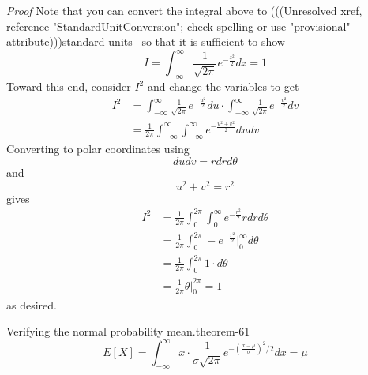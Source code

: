 \documentclass[10pt,]{book}
\makeatletter
\renewcommand*{\proofname}{Proof}
\renewenvironment{proof}[1][\proofname]{\par
  \pushQED{\qed}%
  \normalfont \topsep6\p@\@plus6\p@\relax
  \trivlist
  \item\relax
    {\itshape
    #1\@addpunct{.}}\hspace\labelsep\ignorespaces
}{%
  \popQED\endtrivlist\@endpefalse
}
\numberwithin{equation}{section}
\makeatother
\begin{document}
\begin{proof}\hypertarget{proof-63}{}
\hypertarget{p-1213}{}%
Note that you can convert the integral above to {(((Unresolved xref, reference "StandardUnitConversion"; check spelling or use "provisional" attribute)))}\hyperlink{}{standard units~} so that it is sufficient to show%
\begin{equation*}
I = \int_{-\infty}^{\infty} \frac{1}{\sqrt{2 \pi}} e^{ -\frac{z^2}{2} } dz = 1
\end{equation*}
Toward this end, consider \(I^2\) and change the variables to get%
\begin{align*}
I^2 & = \int_{-\infty}^{\infty} \frac{1}{\sqrt{2 \pi}} e^{ -\frac{u^2}{2} } du \cdot \int_{-\infty}^{\infty} \frac{1}{\sqrt{2 \pi}} e^{ -\frac{v^2}{2} } dv\\
& = \frac{1}{2 \pi} \int_{-\infty}^{\infty} \int_{-\infty}^{\infty} e^{ -\frac{u^2+v^2}{2} } du dv
\end{align*}
Converting to polar coordinates using%
\begin{equation*}
du dv = r dr d\theta 
\end{equation*}
and%
\begin{equation*}
u^2 + v^2 = r^2
\end{equation*}
gives%
\begin{align*}
I^2 & = \frac{1}{2 \pi} \int_0^{2 \pi} \int_0^{\infty} e^{ -\frac{r^2}{2} } r dr d\theta\\
& = \frac{1}{2 \pi} \int_0^{2 \pi} -e^{ -\frac{r^2}{2} } \big |_0^{\infty} d\theta\\
& = \frac{1}{2 \pi} \int_0^{2 \pi} 1 \cdot d\theta\\
& = \frac{1}{2 \pi} \theta \big |_0^{2 \pi} = 1
\end{align*}
as desired.%
\end{proof}
%
\par
\hypertarget{p-1214}{}%
\begin{theorem}{Verifying the normal probability mean.}{}{theorem-61}%
\hypertarget{p-1215}{}%
%
\begin{equation*}
E[X] = \int_{-\infty}^{\infty} x \cdot \frac{1}{\sigma \sqrt{2 \pi}} e^{ - \left ( \frac{x-\mu}{\sigma} \right ) ^2 / 2} dx = \mu
\end{equation*}
%
\end{theorem}
\end{document}
